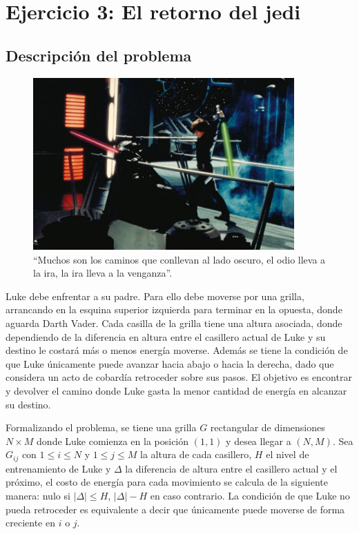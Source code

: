 \section{Ejercicio 3: El retorno del jedi}

    \subsection{Descripción del problema}

    \begin{figure}[ht]
        \begin{center}
            \includegraphics[width=10cm]{imagenes/el_retorno_del_jedi.jpg}
			\caption*{``Muchos son los caminos que conllevan al lado oscuro, el
			odio lleva a la ira, la ira lleva a la venganza''.}
        \end{center}
    \end{figure}

	Luke debe enfrentar a su padre. Para ello debe moverse por una grilla,
	arrancando en la esquina superior izquierda para terminar en la opuesta,
	donde aguarda Darth Vader. Cada casilla de la grilla tiene una altura
	asociada, donde dependiendo de la diferencia en altura entre el casillero
	actual de Luke y su destino le costará más o menos energía moverse. Además
	se tiene la condición de que Luke únicamente puede avanzar hacia abajo o
	hacia la derecha, dado que considera un acto de cobardía retroceder sobre
	sus pasos. El objetivo es encontrar y devolver el camino donde Luke gasta la
	menor cantidad de energía en alcanzar su destino.

	Formalizando el problema, se tiene una grilla $G$ rectangular de dimensiones $N \times
	M$ donde Luke comienza en la posición $(1, 1)$ y desea llegar a $(N, M)$.
	Sea $G_{ij}$ con $1 \leq i \leq N$ y $1 \leq j \leq M$ la altura de cada
	casillero, $H$ el nivel de entrenamiento de Luke y $\Delta$ la
	diferencia de altura entre el casillero actual y el próximo, el costo de
	energía para cada movimiento se calcula de la siguiente manera: nulo si $|\Delta|
	\leq H$, $|\Delta| - H$ en caso contrario. La condición de que Luke no pueda
	retroceder es equivalente a decir que únicamente puede moverse de forma
	creciente en $i$ o $j$.

